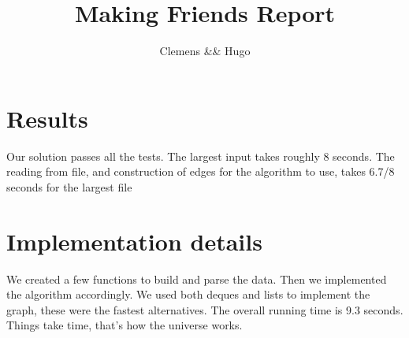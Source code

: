 \documentclass{article}
\title{Making Friends Report}
\author{Clemens && Hugo}
\begin{document}
  \maketitle

  \section{Results}


                Our solution passes all the tests.
                The largest input takes roughly 8 seconds.
                The reading from file, and construction of edges for the algorithm to use, 
                takes 6.7/8 seconds for the largest file

  \section{Implementation details}

                
                We created a few functions to build and parse the data.
                Then we implemented the algorithm accordingly.
                We used both deques and lists to implement the graph,
                these were the fastest alternatives.
                The overall running time is 9.3 seconds. Things take time, that's how the universe works. 

  
\end{document}
